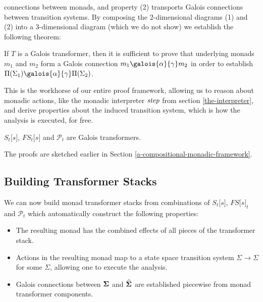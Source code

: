 connections between monads, and property (2) transports Galois
connections between transition systems. By composing the 2-dimensional
diagrams (1) and (2) into a 3-dimensional diagram (which we do not show)
we establish the following theorem: \begin{theorem} If $T$ is a Galois
transformer, then it is sufficient to prove that underlying monads
$m _1 $ and $m _2 $ form a Galois connection
$m _1   \galois{\alpha}{\gamma}  m _2 $ in order to establish
$ \Pi ( \Sigma  _1 )  \galois{\alpha}{\gamma}   \Pi ( \Sigma  _2 )$.
\label{galois-theorem} \end{theorem} This is the workhorse of our entire
proof framework, allowing us to reason about monadic actions, like the
monadic interpreter $ \operatorname{\mathit{step}} $ from section \ref{the-interpreter},
and derive properties about the induced transition system, which is how
the analysis is executed, for free. \begin{proposition}
$S _t  \lbrack s \rbrack $, $FS _t  \lbrack s \rbrack $ and
$ \mathcal{P}  _t $ are Galois transformers. \end{proposition} The
proofs are sketched earlier in Section
\ref{a-compositional-monadic-framework}.

\par

\subsection{Building Transformer
Stacks}\label{building-transformer-stacks}

\par

We can now build monad transformer stacks from combinations of
$S _t  \lbrack s \rbrack $, $FS \lbrack s \rbrack  _t $ and
$ \mathcal{P}  _t $ which automatically construct the following
properties:

\par

\begin{itemize}
\itemsep1pt\parskip0pt
\item
  The resulting monad has the combined effects of all pieces of the
  transformer stack.
\item
  Actions in the resulting monad map to a state space transition system
  $ \Sigma   \rightarrow   \Sigma $ for some $ \Sigma $, allowing one to
  execute the analysis.
\item
  Galois connections between $ \mathtt{\mathbf{\Sigma}} $ and
  $ \widehat{\mathtt{\mathbf{\Sigma}}} $ are established piecewise from monad transformer
  components.
\end{itemize}


